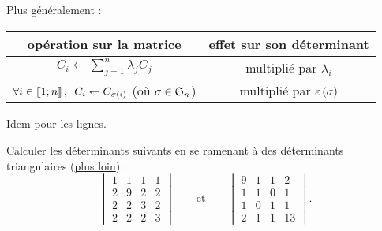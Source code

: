Plus généralement :

\begin{center}
\begin{tabular}{|c|c|}
\hline
opération sur la matrice & effet sur son déterminant \\
\hline
\(C_i\gets\sum_{j=1}^n\lambda_jC_j\) & multiplié par \(\lambda_i\) \\
\hline
\(\quantifs{\forall i\in\interventierii{1}{n}}C_i\gets C_{\sigma\paren{i}}\) (où \(\sigma\in\S{n}\)) & multiplié par \(\sig{\sigma}\) \\
\hline
\end{tabular}
\end{center}

Idem pour les lignes.

\begin{exoex}
Calculer les déterminants suivants en se ramenant à des déterminants triangulaires (\cf \hyperref[subsubsec:déterminantsTriangulaires]{plus loin}) : \[\begin{vmatrix}
1 & 1 & 1 & 1 \\
2 & 9 & 2 & 2 \\
2 & 2 & 3 & 2 \\
2 & 2 & 2 & 3
\end{vmatrix}\qquad\text{et}\qquad\begin{vmatrix}
9 & 1 & 1 & 2 \\
1 & 1 & 0 & 1 \\
1 & 0 & 1 & 1 \\
2 & 1 & 1 & 13
\end{vmatrix}.\]
\end{exoex}

